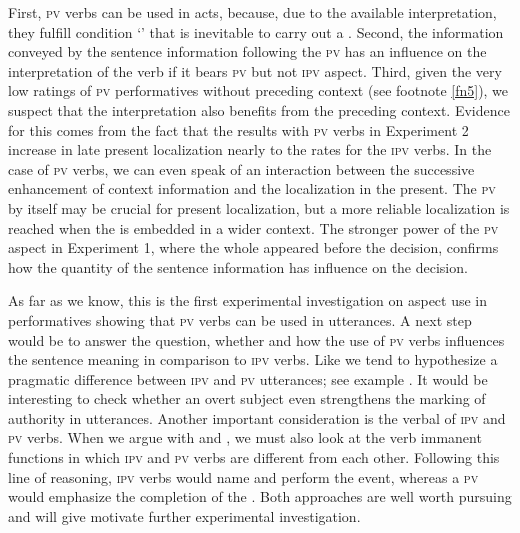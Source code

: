 \documentclass[output=paper,colorlinks,citecolor=brown,newtxmath,hidelinks]{langscibook}
\begin{document}
First, \textsc{pv}  verbs can be used in  acts, because, due to the available  interpretation, they fulfill condition ‘’ that is inevitable to carry out a . Second, the information conveyed by the sentence information following the \textsc{pv}  has an influence on the interpretation of the verb if it bears \textsc{pv} but not \textsc{ipv} aspect. Third, given the very low ratings of \textsc{pv} performatives without preceding context (see footnote \ref{fn5}), we suspect that the  interpretation also benefits from the preceding context. Evidence for this comes from the fact that the results with \textsc{pv} verbs in Experiment 2 increase in late present localization nearly to the rates for the \textsc{ipv} verbs. In the case of \textsc{pv}  verbs, we can even speak of an interaction between the successive enhancement of context information and the localization in the present. The \textsc{pv}  by itself may be crucial for present localization, but a more reliable localization is reached when the  is embedded in a wider context. The stronger  power of the \textsc{pv} aspect in Experiment 1, where the whole  appeared before the decision, confirms how the quantity of the sentence information has influence on the decision.

As far as we know, this is the first experimental investigation on aspect use in  performatives showing that \textsc{pv}  verbs can be used in  utterances. A next step would be to answer the question, whether and how the use of \textsc{pv}  verbs influences the sentence meaning in comparison to \textsc{ipv}  verbs.  Like \citeauthor{Israeli2001} we tend to hypothesize a pragmatic difference between \textsc{ipv} and \textsc{pv}  utterances; see example . It would be interesting to check whether an overt subject even strengthens the marking of authority in  utterances. Another important consideration is the verbal  of \textsc{ipv} and \textsc{pv}  verbs. When we argue with \citet{Breu1980} and \citet{Dewit2017}, we must also look at the verb immanent  functions in which \textsc{ipv} and \textsc{pv}  verbs are different from each other. Following this line of reasoning, \textsc{ipv}  verbs would name and perform the  event, whereas a \textsc{pv}  would emphasize the completion of the . Both approaches are well worth pursuing and will give motivate further experimental investigation.
\end{document}
